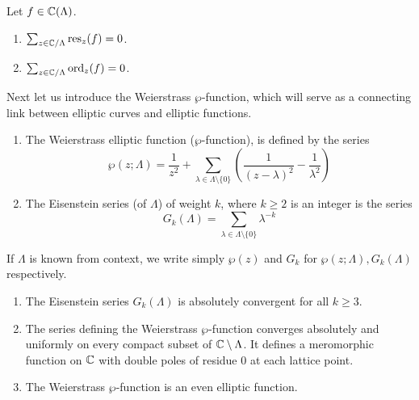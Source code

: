\begin{proposition}
	\label{prop:residue}
	Let $f \in \mathbb{C}(\Lambda)$.
	\begin{enumerate}[label=(\alph*)]
		\item $\sum_{z \in \mathbb{C}/\Lambda} \operatorname{res}_z(f) = 0$.
		\item $\sum_{z \in \mathbb{C}/\Lambda} \operatorname{ord}_z(f) = 0$.
	\end{enumerate}
\end{proposition}

Next let us introduce the Weierstrass $\wp$-function, which will serve
as a connecting link between elliptic curves and elliptic functions.

\begin{definition}
	\begin{enumerate}[label=(\alph*)]
		\item
			The Weierstrass
			elliptic function ($\wp$-function),
			is defined by the series
			\begin{equation*}
				\wp(z; \Lambda) = \frac{1}{z^2}
				+ \sum_{\lambda \in \Lambda\setminus\{0\}}
				\left(
					\frac{1}{(z-\lambda)^2} - \frac{1}{\lambda^2}
				\right)
			\end{equation*}
		\item
			The Eisenstein series (of $\Lambda$) of weight $k$,
			where $k \geq 2$ is an integer
			is the series
			\begin{equation*}
				G_k(\Lambda) = \sum_{\lambda \in \Lambda\setminus\{0\}}
				\lambda^{-k}
			\end{equation*}
	\end{enumerate}
\end{definition}

\begin{notation}
	If $\Lambda$ is known from context, we write simply
	$\wp(z)$ and $G_k$ for $\wp(z; \Lambda), G_k(\Lambda)$
	respectively.
\end{notation}

\begin{proposition}
	\label{prop:wp-properties}
	\begin{enumerate}[label=(\alph*)]
		\item	The Eisenstein series $G_k(\Lambda)$ is absolutely convergent
			for all $k \geq 3$.
		\item The series defining the Weierstrass $\wp$-function converges
			absolutely and uniformly on every compact subset of
			$\mathbb{C}\setminus\Lambda$. It defines a meromorphic function on $\mathbb{C}$ with 
			double poles of residue 0 at each lattice point.
		\item The Weierstrass $\wp$-function is an even elliptic function.
	\end{enumerate}
\end{proposition}

